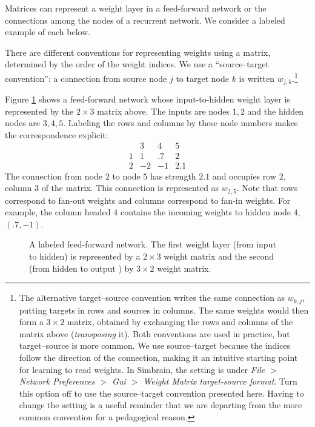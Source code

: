 Matrices can represent a weight layer in a feed-forward network or the connections among the nodes of a recurrent network. We consider a labeled example of each below.

There are different conventions for representing weights using a matrix, determined by the order of the weight indices. We use a ``source--target convention'': a connection from source node $j$ to target node $k$ is written $w_{j,k}$.\footnote{The alternative target--source convention writes the same connection as $w_{k,j}$, putting targets in rows and sources in columns. The same weights would then form a $3\times2$ matrix, obtained by exchanging the rows and columns of the matrix above (\emph{transposing} it). Both conventions are used in practice, but target--source is more common. We use source--target because the indices follow the direction of the connection, making it an intuitive starting point for learning to read weights. In Simbrain, the setting is under \emph{File $>$ Network Preferences $>$ Gui $>$ Weight Matrix target-source format}. Turn this option off to use the source--target convention presented here. Having to change the setting is a useful reminder that we are departing from the more common convention for a pedagogical reason.}

Figure \ref{abridged_labelled_ff} shows a feed-forward network whose input-to-hidden weight layer is represented by the $2\times3$ matrix above. The inputs are nodes $1,2$ and the hidden nodes are $3,4,5$. Labeling the rows and columns by these node numbers makes the correspondence explicit:
\[
\begin{array}{c|rrr}
 & 3 & 4 & 5\\\hline
1 & 1 & .7 & 2\\
2 & -2 & -1 & 2.1
\end{array}
\]
The connection from node $2$ to node $5$ has strength $2.1$ and occupies row $2$, column $3$ of the matrix. This connection is represented as $w_{2,5}$. Note that rows correspond to fan-out weights and columns correspond to fan-in weights. For example, the column headed $4$ contains the incoming weights to hidden node $4$, $(.7,-1)$.

\begin{figure}[!ht]
\centering
{}
\caption[Simbrain screenshot modified by Jeff Yoshimi.]{A labeled feed-forward network. The first weight layer (from input to hidden) is represented by a $2\times 3$ weight matrix and the second (from hidden to output ) by $3 \times 2$ weight matrix. }
\label{abridged_labelled_ff}
\end{figure}

